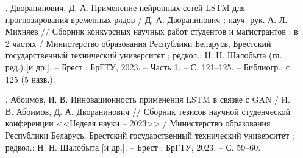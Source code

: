 {\begin{itemize}[leftmargin=2.15cm, labelwidth=0.65cm, labelsep=0.0cm]
    \item[\theimagecntr.] Дворанинович, Д. А. Применение нейронных сетей LSTM для прогнозирования временных рядов / Д. А. Дворанинович ; науч. рук. А. Л. Михняев // Сборник конкурсных научных работ студентов и магистрантов : в 2 частях / Министерство образования Республики Беларусь, Брестский государственный технический университет ; редкол.: Н. Н. Шалобыта (гл. ред.) [и др.]. {--} Брест : БрГТУ, 2023. {--} Часть 1. {--} С. 121–125. – Библиогр.: с. 125 (5 назв.).
    \addtocounter{imagecntr}{1}

    \item[\theimagecntr.] Абоимов, И. В. Инновационность применения LSTM в связке с GAN / И. В. Абоимов, Д. А. Дворанинович // Сборник тезисов научной студенческой конференции <<Неделя науки {--} 2023>> / Министерство образования Республики Беларусь, Брестский государственный технический университет ; редкол.: Н. Н. Шалобыта [и др.]. {--} Брест : БрГТУ, 2023. {--} С. 59–60.
    \addtocounter{imagecntr}{1}

\end{itemize}

}
